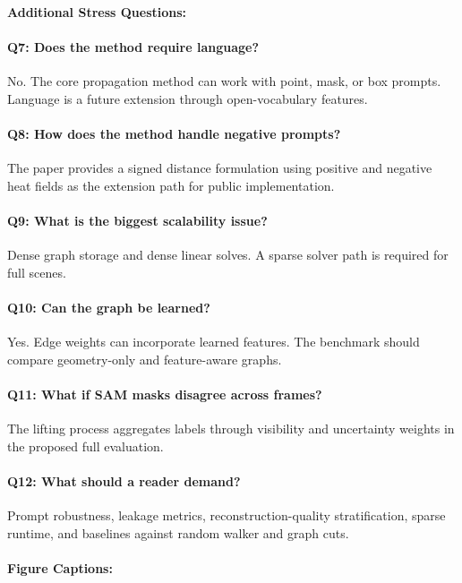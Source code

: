 \documentclass{article}
\begin{document}
\paragraph{Additional Stress Questions:}

\paragraph{Q7: Does the method require language?}
No. The core propagation method can work with point, mask, or box prompts. Language is a future extension through open-vocabulary features.

\paragraph{Q8: How does the method handle negative prompts?}
The paper provides a signed distance formulation using positive and negative heat fields as the extension path for public implementation.

\paragraph{Q9: What is the biggest scalability issue?}
Dense graph storage and dense linear solves. A sparse solver path is required for full scenes.

\paragraph{Q10: Can the graph be learned?}
Yes. Edge weights can incorporate learned features. The benchmark should compare geometry-only and feature-aware graphs.

\paragraph{Q11: What if SAM masks disagree across frames?}
The lifting process aggregates labels through visibility and uncertainty weights in the proposed full evaluation.

\paragraph{Q12: What should a reader demand?}
Prompt robustness, leakage metrics, reconstruction-quality stratification, sparse runtime, and baselines against random walker and graph cuts.

\paragraph{Figure Captions:}
\end{document}
